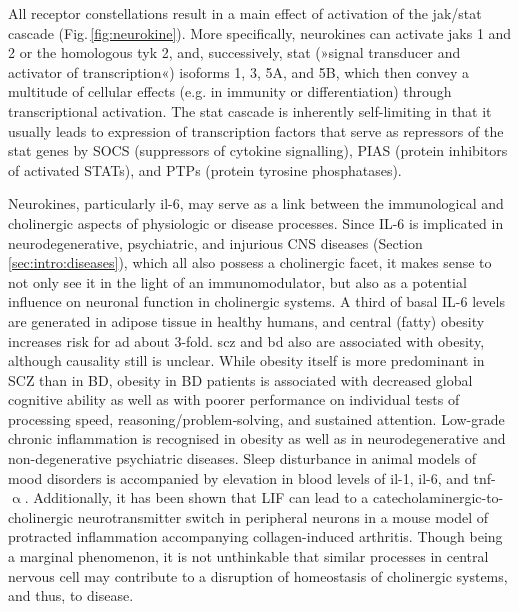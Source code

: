 All receptor constellations result in a main effect of activation of the \acs{jak}/\acs{stat} cascade (Fig.\,\ref{fig:neurokine}). More specifically, neurokines can activate \acfp{jak} 1 and 2 or the homologous \ac{tyk} 2, and, successively, \ac{stat} (»signal transducer and activator of transcription«) isoforms 1, 3, 5A, and 5B, which then convey a multitude of cellular effects (e.g. in immunity or differentiation) through transcriptional activation. The \ac{stat} cascade is inherently self-limiting in that it usually leads to expression of transcription factors that serve as repressors of the \ac{stat} genes by SOCS (suppressors of cytokine signalling), PIAS (protein inhibitors of activated STATs), and PTPs (protein tyrosine phosphatases).\cite{Rawlings2004}

Neurokines, particularly \ac{il}-6, may serve as a link between the immunological and cholinergic aspects of physiologic or disease processes. Since IL-6 is implicated in neurodegenerative, psychiatric, and injurious CNS diseases (Section \ref{sec:intro:diseases}), which all also possess a cholinergic facet, it makes sense to not only see it in the light of an immunomodulator, but also as a potential influence on neuronal function in cholinergic systems. A third of basal IL-6 levels are generated in adipose tissue in healthy humans,\cite{Mohamed-Ali1997} and central (fatty) obesity increases risk for \ac{ad} about 3-fold.\cite{Gustafson2004, Profenno2010} \Ac{scz} and \ac{bd} also are associated with obesity, although causality still is unclear. While obesity itself is more predominant in SCZ than in BD, obesity in BD patients is associated with decreased global cognitive ability as well as with poorer performance on individual tests of processing speed, reasoning/problem‐solving, and sustained attention.\cite{Depp2014} Low-grade chronic inflammation is recognised in obesity\cite{Eder2009} as well as in neurodegenerative\cite{Heppner2015} and non-degenerative psychiatric diseases.\cite{Kirkpatrick2013, Takao2013} Sleep disturbance in animal models of mood disorders is accompanied by elevation in blood levels of \ac{il}-1, \ac{il}-6, and \ac{tnf}-$\upalpha$.\cite{Hodes2015} Additionally, it has been shown that LIF can lead to a catecholaminergic-to-cholinergic neurotransmitter switch in peripheral neurons in a mouse model of protracted inflammation accompanying collagen-induced arthritis.\cite{Stangl2015} Though being a marginal phenomenon, it is not unthinkable that similar processes in central nervous cell may contribute to a disruption of homeostasis of cholinergic systems, and thus, to disease.

